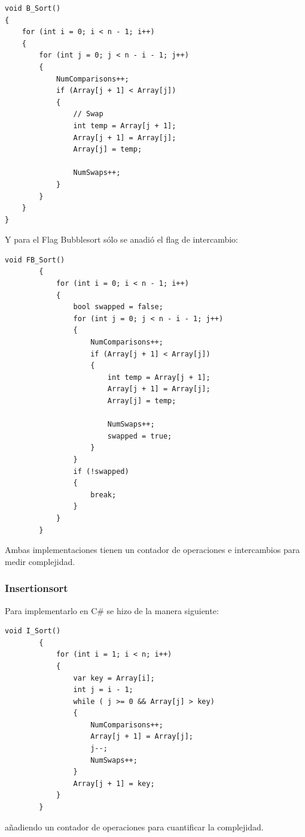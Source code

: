 \documentclass[conference]{IEEEtran}
\begin{document}
\begin{verbatim}
void B_Sort()
{
    for (int i = 0; i < n - 1; i++)
    {
        for (int j = 0; j < n - i - 1; j++)
        {
            NumComparisons++;
            if (Array[j + 1] < Array[j])
            {
                // Swap
                int temp = Array[j + 1];
                Array[j + 1] = Array[j];
                Array[j] = temp;

                NumSwaps++;
            }
        }
    }
}
\end{verbatim}
Y para el Flag Bubblesort sólo se anadió el flag de intercambio:
\begin{verbatim}
void FB_Sort()
        {
            for (int i = 0; i < n - 1; i++)
            {
                bool swapped = false;
                for (int j = 0; j < n - i - 1; j++)
                {
                    NumComparisons++;
                    if (Array[j + 1] < Array[j])
                    {
                        int temp = Array[j + 1];
                        Array[j + 1] = Array[j];
                        Array[j] = temp;

                        NumSwaps++;
                        swapped = true;
                    }
                }
                if (!swapped)
                {
                    break;
                }
            }
        }
\end{verbatim}
Ambas implementaciones tienen un contador de operaciones e intercambios para medir complejidad.

\subsubsection{Insertionsort}
Para implementarlo en C\# se hizo de la manera siguiente:
\begin{verbatim}
void I_Sort()
        {
            for (int i = 1; i < n; i++)
            {
                var key = Array[i];
                int j = i - 1;
                while ( j >= 0 && Array[j] > key)
                {
                    NumComparisons++;
                    Array[j + 1] = Array[j];
                    j--;  
                    NumSwaps++;    
                }
                Array[j + 1] = key;
            }
        }
\end{verbatim}
añadiendo un contador de operaciones para cuantificar la complejidad.
\end{document}
